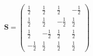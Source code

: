 \[ \mathbf{S} = \left(\begin{array}{cccc}  \frac{ 1 }{2}  &  \frac{ 1
}{ 2 }  &  \frac{ 1 }{ 2 }  &  -\frac{ 1 }{ 2 }  \\  \frac{ 1 }{ 2 }
&  \frac{ 1 }{2}  &  -\frac{ 1 }{ 2 }  &  \frac{ 1 }{ 2 }  \\  \frac{
1 }{ 2 }  &  -\frac{ 1 }{ 2 }  &  \frac{ 1 }{ 2 }  &  \frac{ 1 }{2}
\\  -\frac{ 1 }{ 2 }  &  \frac{ 1 }{ 2 }  &  \frac{ 1 }{2}  &  \frac{
1 }{ 2 }  \end{array}\right) \]
